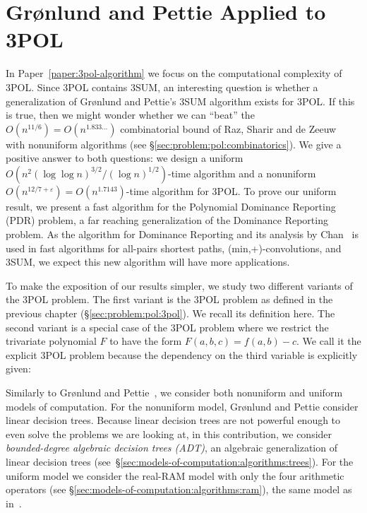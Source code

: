 \section{Gr\o nlund and Pettie Applied to 3POL}

In Paper~\ref{paper:3pol-algorithm}
we focus on the computational complexity of 3POL\@. Since 3POL contains 3SUM,
an interesting question is whether a generalization of Gr\o nlund and Pettie's
3SUM algorithm exists for 3POL\@. If this is true, then we might wonder whether
we can ``beat'' the $O(n^{11/6}) = O(n^{1.833\ldots})$ combinatorial bound of Raz,
Sharir and de Zeeuw~\cite{RSZ15} with nonuniform algorithms
(see \S\ref{sec:problem:pol:combinatorics}).
%
We give a positive
answer to both questions: we design
a uniform
$O(n^2 {(\log \log n)}^{3/2} / {(\log n)}^{1/2})$-time
algorithm
and
a nonuniform
$O(n^{12/7+\varepsilon}) = O(n^{1.7143})$-time algorithm
for 3POL\@.
%
To prove our uniform result, we present a fast algorithm for the Polynomial
Dominance Reporting (PDR) problem, a far reaching generalization of the
Dominance Reporting problem. As the algorithm for Dominance Reporting and its
analysis by Chan~\cite{Cha08} is used in fast algorithms for all-pairs shortest
paths, (min,+)-convolutions, and 3SUM, we expect this new algorithm will have
more applications.

To make the exposition of our results simpler,
we study two different variants of the 3POL problem.
The first variant is the 3POL problem as defined in the previous chapter
(\S\ref{sec:problem:pol:3pol}).
We recall its definition here.
\ProblemPOLImplicit*
The second variant is a special case of the 3POL problem where we
restrict the trivariate polynomial $F$ to have the form $F(a,b,c) = f(a,b) -
c$. We call it the explicit 3POL problem because the dependency on the third
variable is explicitly given:
%


Similarly to Gr\o nlund and Pettie~\cite{GP18}, we consider both nonuniform
and uniform models of computation.
%
For the nonuniform model, Gr\o nlund and Pettie consider linear
decision trees.
%
Because linear decision trees are not powerful enough to even solve the
problems we are looking at,
in this contribution, we consider
\emph{bounded-degree algebraic decision trees (ADT)},
an algebraic generalization of linear decision trees
(see~\S\ref{sec:models-of-computation:algorithms:trees}).
%
For the uniform model we consider the real-RAM model with only the four
arithmetic operators (see \S\ref{sec:models-of-computation:algorithms:ram}),
the same model as in~\cite{GP18}.

